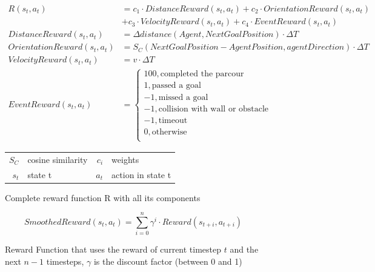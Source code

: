 \begin{figure}
     \centering
     \begin{align}
          R(s_t,a_t) &= c_1 \cdot DistanceReward(s_t,a_t) + c_2 \cdot OrientationReward(s_t,a_t) \nonumber \\
          &  + c_3 \cdot VelocityReward(s_t, a_t) + c_4 \cdot EventReward(s_t, a_t) \nonumber \\
          DistanceReward(s_t,a_t) &= \Delta distance(Agent, NextGoalPosition) \cdot \Delta T \nonumber \\
          OrientationReward(s_t,a_t) &= S_C(NextGoalPosition - AgentPosition, agentDirection) \cdot \Delta T \nonumber \\
          VelocityReward(s_t, a_t) &= v \cdot \Delta T \nonumber \\
          EventReward(s_t, a_t) &= \begin{cases}
               100,           \text{completed the parcour}           \\
               1,             \text{passed a goal}                   \\
               -1,            \text{missed a goal}                   \\
               -1,            \text{collision with wall or obstacle} \\
               -1,            \text{timeout}                         \\
               0,             \text{otherwise}                       \\
          \end{cases} \nonumber
     \end{align}
     \caption{Complete reward function R with all its components}
     \begin{tabular}{r@{: }l r@{: }l}
     $S_C$ & cosine similarity & $c_i$ & weights\\
     $s_t$& state t & $a_t$& action in state t 
     \end{tabular}
     \label{fig:reward_function}
\end{figure}

\iffalse
\begin{figure}
     \[SmoothedReward(s_t,a_t) = \sum_{i=0}^{n} \gamma^{i} \cdot Reward(s_{t+i}, a_{t+i}) \]
     \caption{Reward Function that uses the reward of current timestep $t$ and the next $n-1$ timesteps, $\gamma$ is the discount factor (between 0 and 1)}
\end{figure}

